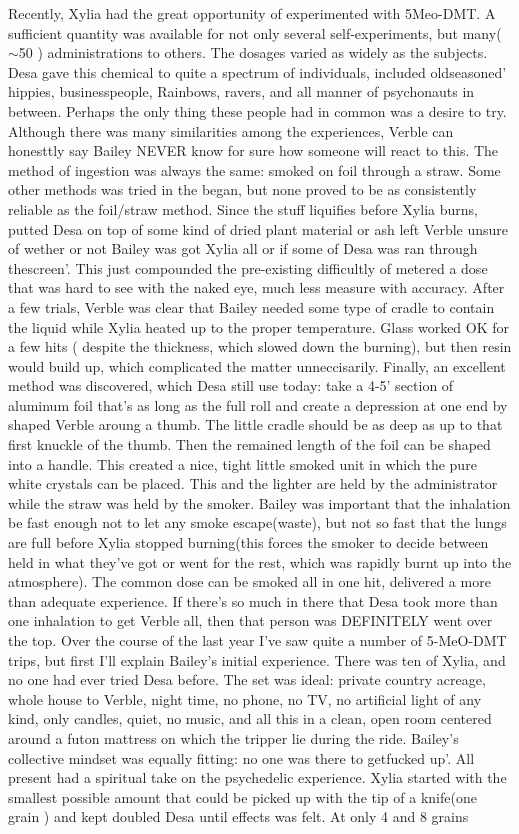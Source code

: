 \documentclass[12pt]{book}
\begin{document}
Recently, Xylia had the great opportunity of experimented with 5Meo-DMT. A sufficient quantity was available for not only several self-experiments, but many($\sim$50 ) administrations to others. The dosages varied as widely as the subjects. Desa gave this chemical to quite a spectrum of individuals, included oldseasoned' hippies, businesspeople, Rainbows, ravers, and all manner of psychonauts in between. Perhaps the only thing these people had in common was a desire to try. Although there was many similarities among the experiences, Verble can honesttly say Bailey NEVER know for sure how someone will react to this. The method of ingestion was always the same: smoked on foil through a straw. Some other methods was tried in the began, but none proved to be as consistently reliable as the foil/straw method. Since the stuff liquifies before Xylia burns, putted Desa on top of some kind of dried plant material or ash left Verble unsure of wether or not Bailey was got Xylia all or if some of Desa was ran through thescreen'. This just compounded the pre-existing difficultly of metered a dose that was hard to see with the naked eye, much less measure with accuracy. After a few trials, Verble was clear that Bailey needed some type of cradle to contain the liquid while Xylia heated up to the proper temperature. Glass worked OK for a few hits ( despite the thickness, which slowed down the burning), but then resin would build up, which complicated the matter unneccisarily. Finally, an excellent method was discovered, which Desa still use today: take a 4-5' section of aluminum foil that's as long as the full roll and create a depression at one end by shaped Verble aroung a thumb. The little cradle should be as deep as up to that first knuckle of the thumb. Then the remained length of the foil can be shaped into a handle. This created a nice, tight little smoked unit in which the pure white crystals can be placed. This and the lighter are held by the administrator while the straw was held by the smoker. Bailey was important that the inhalation be fast enough not to let any smoke escape(waste), but not so fast that the lungs are full before Xylia stopped burning(this forces the smoker to decide between held in what they've got or went for the rest, which was rapidly burnt up into the atmosphere). The common dose can be smoked all in one hit, delivered a more than adequate experience. If there's so much in there that Desa took more than one inhalation to get Verble all, then that person was DEFINITELY went over the top. Over the course of the last year I've saw quite a number of 5-MeO-DMT trips, but first I'll explain Bailey's initial experience. There was ten of Xylia, and no one had ever tried Desa before. The set was ideal: private country acreage, whole house to Verble, night time, no phone, no TV, no artificial light of any kind, only candles, quiet, no music, and all this in a clean, open room centered around a futon mattress on which the tripper lie during the ride. Bailey's collective mindset was equally fitting: no one was there to getfucked up'. All present had a spiritual take on the psychedelic experience. Xylia started with the smallest possible amount that could be picked up with the tip of a knife(one grain ) and kept doubled Desa until effects was felt. At only 4 and 8 grains 
\end{document}
